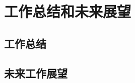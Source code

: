 
\chapter{工作总结和未来展望}
\label{chap:future}

\section{工作总结}
\label{sec:summaryall}

\section{未来工作展望}
\label{sec:futurework}

